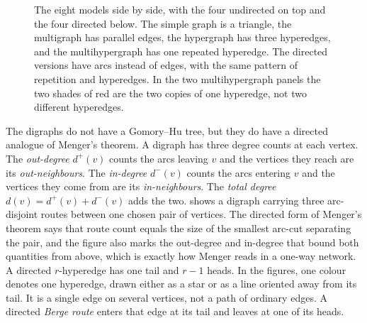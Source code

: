\begin{figure}[ht]
{}
\caption{The eight models side by side, with the four undirected on top and the four directed below. The simple graph is a triangle, the multigraph has parallel edges, the hypergraph has three hyperedges, and the multihypergraph has one repeated hyperedge. The directed versions have arcs instead of edges, with the same pattern of repetition and hyperedges. In the two multihypergraph panels the two shades of red are the two copies of one hyperedge, not two different hyperedges.}
\label{fig:eight-models}
\end{figure}

The digraphs do not have a Gomory--Hu tree, but they do have a directed analogue of Menger's theorem.
A digraph has three degree counts at each vertex. The \emph{out-degree} $d^+(v)$ counts the arcs leaving $v$ and the vertices they reach are its \emph{out-neighbours}.
The \emph{in-degree} $d^-(v)$ counts the arcs entering $v$ and the vertices they come from are its \emph{in-neighbours}.
The \emph{total degree} $d(v) = d^+(v) + d^-(v)$ adds the two.
 shows a digraph carrying three arc-disjoint routes between one chosen pair of vertices.
The directed form of Menger's theorem says that route count equals the size of the smallest arc-cut separating the pair, and the figure also marks the out-degree and in-degree that bound both quantities from above, which is exactly how Menger reads in a one-way network.
A directed $r$-hyperedge has one tail and $r-1$ heads.
In the figures, one colour denotes one hyperedge, drawn either as a star or as a line oriented away from its tail.
It is a single edge on several vertices, not a path of ordinary edges.
A directed \emph{Berge route} enters that edge at its tail and leaves at one of its heads.

